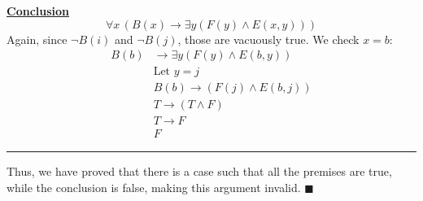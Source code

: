 \documentclass[]{article}
\begin{document}
\underline{\textbf{Conclusion}}  
\[
\forall x\,(B(x) \rightarrow \exists y(F(y) \land E(x, y)))
\]
Again, since $\neg B(i)$ and $\neg B(j)$, those are vacuously true.  
We check $x = b$:
\begin{align*}
    B(b) &\rightarrow \exists y(F(y) \land E(b, y)) \\
    &\text{Let } y = j \\
    &B(b) \rightarrow (F(j) \land E(b, j)) \\
    &T \rightarrow (T \land F) \\
    &T \rightarrow F \\
    &F
\end{align*}


\hrule
\vspace{0.1in}
Thus, we have proved that there is a case such that all the premises are true, 
while the conclusion is false, making this argument invalid. $\blacksquare$
\end{document}
